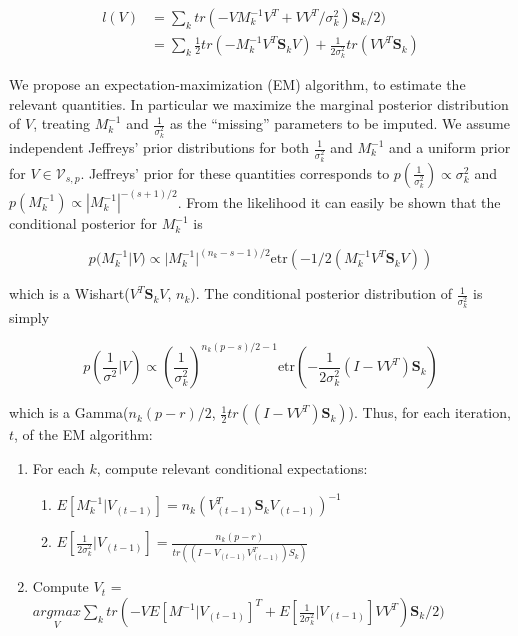 \documentclass{article}
\newcommand{\etr}{\text{etr}}
\begin{document}
\begin{align}
l(V) &= \sum_k tr\left(-VM_k^{-1}V^T +
       VV^T/\sigma^2_k\right)\mathbf{S}_k/2)\\
&= \sum_k \frac{1}{2}tr\left(-M_k^{-1}V^T \mathbf{S}_kV\right) + \frac{1}{2\sigma_k^2}tr\left(VV^T \mathbf{S}_k\right)
\end{align}


We propose an expectation-maximization (EM) algorithm, to estimate the
relevant quantities.  In particular we maximize the marginal posterior
distribution of $V$, treating $M_k^{-1}$ and $\frac{1}{\sigma_k^2}$ as
the ``missing'' parameters to be imputed.  We assume independent
Jeffreys' prior distributions for both $\frac{1}{\sigma_k^2}$ and
$M_k^{-1}$ and a uniform prior for $V \in \mathcal{V}_{s, p}$.
Jeffreys' prior for these quantities corresponds to
$p(\frac{1}{\sigma_k^2}) \propto \sigma_k^2$ and
$p(M_k^{-1}) \propto |M_k^{-1}|^{-(s+1)/2}$.  From the likelihood it
can easily be shown that the conditional posterior for $M_k^{-1}$ is

$$p(M_k^{-1} | V) \propto |M_k^{-1}|^{(n_k - s -1)/2}\etr(-1/2(M_k^{-1}V^T\mathbf{S}_kV)) $$

\noindent which is a Wishart($V^T\mathbf{S}_kV$, $n_k$).  The
conditional posterior distribution of $\frac{1}{\sigma_k^2}$ is simply

$$p\left(\frac{1}{\sigma^2} | V\right) \propto \left(\frac{1}{\sigma_k^2}\right)^{n_k(p-s)/2-1}\etr\left(-\frac{1}{2\sigma^2_k} (I-VV^T)\mathbf{S}_k\right)  $$

\noindent which is a Gamma($n_k(p-r)/2$,
$\frac{1}{2}tr((I-VV^T)\mathbf{S}_k)$).  Thus, for each iteration,
$t$, of the EM algorithm:

\begin{enumerate}
\item For each $k$, compute relevant conditional expectations:
\begin{enumerate}
\item $E[M_k^{-1} | V_{(t-1)}] = n_k(V_{(t-1)}^T \mathbf{S}_kV_{(t-1)})^{-1}$
\item $E[\frac{1}{2\sigma_k^2}|V_{(t-1)}] = \frac{n_k(p-r)}{tr((I-V_{(t-1)}V_{(t-1)}^T)S_k)}$
\end{enumerate}
\item Compute $V_{t}$ = $\underset{V}{argmax}  \sum_k tr\left(-VE[M^{-1}|V_{(t-1)}]^T +
       E[\frac{1}{2\sigma_k^2}|V_{(t-1)}]VV^T\right)\mathbf{S}_k/2)$ 
\end{enumerate}
\end{document}
